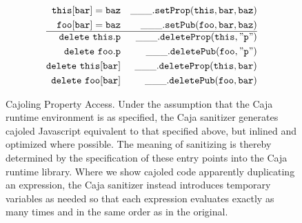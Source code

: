 \documentclass[letterpaper,twocolumn,10pt]{article}
\newcommand{\code}[1]{{\tt {#1}}}              %
\begin{document}
\begin{figure}
\begin{eqnarray}
  \code{this[bar] = baz}    & \label{set:index-internal} & \code{\_\_\_.setProp(this,bar,baz)} \\
  \code{foo[bar] = baz}     & \label{set:index-public}  & \code{\_\_\_.setPub(foo,bar,baz)} \\
  \hline
  \code{delete\ this.p}     & \label{delete-internal}   & \code{\_\_\_.deleteProp(this,"p")} \\
  \code{delete\ foo.p}      & \label{delete:public}     & \code{\_\_\_.deletePub(foo,"p")} \\
  \code{delete\ this[bar]}  & \label{delete:index-internal} & \code{\_\_\_.deleteProp(this,bar)} \\
 \code{delete\ foo[bar]}    & \label{delete:index-public}   & \code{\_\_\_.deletePub(foo,bar)} \\
\end{eqnarray}

\caption[Cajoling Property Access]{Cajoling Property Access. Under the 
assumption that the Caja runtime environment is as specified, the Caja 
sanitizer generates cajoled Javascript equivalent to that specified above, 
but inlined and optimized where possible. The meaning of sanitizing is 
thereby determined by the specification of these entry points into the Caja 
runtime library. Where we show cajoled code apparently duplicating an 
expression, the Caja sanitizer instead introduces temporary variables as 
needed so that each expression evaluates exactly as many times and in the 
same order as in the original.}
\label{tab:prop-xlate}
\end{figure}
\end{document}
